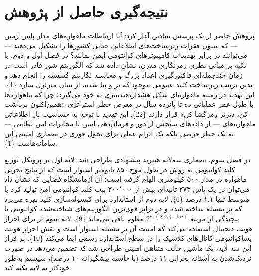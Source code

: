 \documentclass[a4paper,14pt]{extreport}
\begin{document}
\section{نتیجه‌گیری حاصل از پژوهش}

پژوهش حاضر از یک پرسش بنیادین آغاز کرد: آیا ارتباطات ماهواره‌های مدار پایین زمین  --- که ستون فقرات زیرساخت‌های اطلاعاتی حیاتی کشورها را تشکیل می‌دهند --- می‌توانند در برابر تهدیدات کامپیوترهای کوانتومی ایمن بمانند؟ در فصل اول و دوم، با تکیه بر مبانی نظری رمزنگاری مدرن، نشان داده شد که الگوریتم شور  قادر است در زمان چندجمله‌ای فاکتورگیری اعداد بزرگ و محاسبه لگاریتم گسسته را انجام دهد و بدین ترتیب زیرساخت کلید عمومی  موجود که بر  و  بنا شده، از بنیان متزلزل سازد \{1\}. این تهدید در زمینه ماهواره‌ای شکل هشداردهنده‌تری به خود می‌گیرد؛ چرا که ماهواره‌ها با طول عمر عملیاتی ده تا پانزده سال در معرض خطر استراتژی «همین‌اکنون برداشت کن، دیرتر رمزگشا کن»  قرار دارند \{22\}. این تهدید با توجه به حساسیت بار اطلاعاتی ماهواره‌های  --- از داده‌های سنجش از دور و فرمان‌دهی ایمن تا مخابرات امن نظامی --- نه یک خطر فرضی بلکه یک الزام عملی برای تحول فوری در معماری امنیتی این سامانه‌هاست \{1\}.

در فصل سوم، معماری سه‌لایه هیبرید پیشنهادی طراحی شد. لایه اول بر پروتکل توزیع کلید کوانتومی  به روش  در طول موج ۸۵۰ نانومتر استوار است که از نتایج تجربی ماهواره  در مدار ۵۰۰ کیلومتری الهام گرفته است؛ آن آزمایشگاه فضایی که نشان داد می‌توان در یک پاس ۲۷۳ ثانیه‌ای بیش از ۳۰۰٬۰۰۰ بیت کلید کوانتومی امن تولید کرد با  متوسط تنها ۱.۱ درصد \{6\}. لایه دوم از استاندارد  برای کپسوله‌سازی کلید بهره می‌برد که بر مسئله  ساخته شده و در برابر قوی‌ترین الگوریتم‌های شناخته‌شده کوانتومی با پیچیدگی از مرتبه $2^{c \cdot (N/\beta) \cdot \log \beta}$ مقاوم باقی می‌ماند \{9\}. لایه سوم از  برای احراز هویت دیجیتال استفاده می‌کند که امنیت آن بر مسئله  استوار است و نقش احراز هویت پساکوانتومی کانال‌های کلاسیک  را در سطح استاندارد رسمی  ایفا می‌کند \{10\}. بر فراز این سه لایه، یک ماشین حالت متناهی امنیتی  طراحی شد که تضمین می‌دهد در صورت نزدیک‌شدن  به آستانه بحرانی ۱۱ درصد (با حاشیه پیشگیرانه ۱۰ درصد)، سیستم به‌طور خودکار به لایه  تکیه کند.
\end{document}
